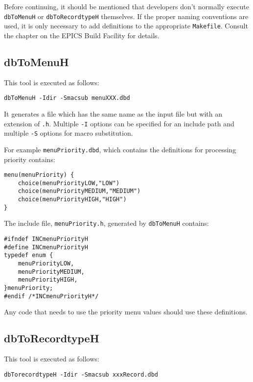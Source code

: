 Before continuing, it should be mentioned that developers don't normally execute \verb|dbToMenuH| or \verb|dbToRecordtypeH| themselves.
If the proper naming conventions are used, it is only necessary to add definitions to the appropriate \verb|Makefile|.
Consult the chapter on the EPICS Build Facility for details.

\subsection{dbToMenuH}

This tool is executed as follows:

\begin{verbatim}
dbToMenuH -Idir -Smacsub menuXXX.dbd
\end{verbatim}

It generates a file which has the same name as the input file but with an extension of \verb|.h|.
Multiple \verb|-I| options can be specified for an include path and multiple \verb|-S| options for macro substitution.

For example \verb|menuPriority.dbd|, which contains the definitions for processing priority contains:

\begin{verbatim}
menu(menuPriority) {
    choice(menuPriorityLOW,"LOW")
    choice(menuPriorityMEDIUM,"MEDIUM")
    choice(menuPriorityHIGH,"HIGH")
}
\end{verbatim}

The include file, \verb|menuPriority.h|, generated by \verb|dbToMenuH| contains:

\begin{verbatim}
#ifndef INCmenuPriorityH
#define INCmenuPriorityH
typedef enum {
    menuPriorityLOW,
    menuPriorityMEDIUM,
    menuPriorityHIGH,
}menuPriority;
#endif /*INCmenuPriorityH*/

\end{verbatim}

Any code that needs to use the priority menu values should use these definitions.

\subsection{dbToRecordtypeH}

This tool is executed as follows:

\begin{verbatim}
dbTorecordtypeH -Idir -Smacsub xxxRecord.dbd
\end{verbatim}

